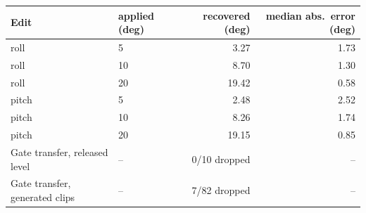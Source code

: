 \begin{tabular}{llrr}
\toprule
Edit & applied (deg) & recovered (deg) & median abs.\ error (deg) \\
\midrule
roll & 5 & 3.27 & 1.73 \\
roll & 10 & 8.70 & 1.30 \\
roll & 20 & 19.42 & 0.58 \\
pitch & 5 & 2.48 & 2.52 \\
pitch & 10 & 8.26 & 1.74 \\
pitch & 20 & 19.15 & 0.85 \\
\midrule
Gate transfer, released level & -- & 0/10 dropped & -- \\
Gate transfer, generated clips & -- & 7/82 dropped & -- \\
\bottomrule
\end{tabular}
